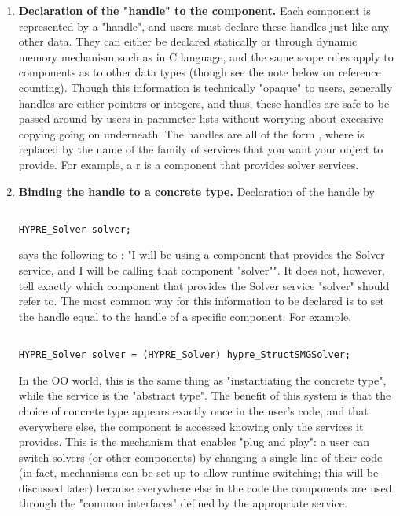 \begin{enumerate}

\item
{\bf Declaration of the "handle" to the component.}  Each \hypre{} component is
represented by a 
"handle", and users must declare these handles just like any other data. They
can either be declared
statically or through dynamic memory mechanism such as  in C language,
and the same 
scope rules apply to \hypre{} components as to other data types (though see the
note below on 
reference counting). Though this information is technically "opaque" to users,
generally \hypre{} 
handles are either pointers or integers, and thus, these handles are safe to be
passed around by users in 
parameter lists without worrying about excessive copying going on underneath. 
The handles are all of the form
, where 
 is replaced by the name of the family of services that you want your
\hypre{} object to 
provide. For example, a r is a component that provides solver
services.

\item
{\bf Binding the handle to a concrete type.} Declaration of the handle by

\begin{display}
\begin{verbatim}

HYPRE_Solver solver; 

\end{verbatim}
\end{display}

says the 
following to \hypre{}: "I will be using a \hypre{} component that provides the Solver
service, and I will 
be calling that component "solver"". It does not, however, tell \hypre{} exactly
which component that 
provides the Solver service "solver" should refer to. The most common way for
this information to be 
declared is to set the handle equal to the handle of a specific component. For
example, 

\begin{display}
\begin{verbatim}

HYPRE_Solver solver = (HYPRE_Solver) hypre_StructSMGSolver;

\end{verbatim}
\end{display}

In the OO world, this is the
same thing as 
"instantiating the concrete type", while the service is the "abstract
type". The benefit of this 
system is that the choice of concrete type appears exactly once in the user's
code, and that everywhere 
else, the component is accessed knowing only the services it provides. This is
the mechanism that 
enables "plug and play": a user can switch solvers (or other components) by
changing a single line of 
their code (in fact, mechanisms can be set up to allow runtime switching; this
will be discussed later) 
because everywhere else in the code the components are used through the "common
interfaces" 
defined by the appropriate \hypre{} service.


\end{enumerate}
